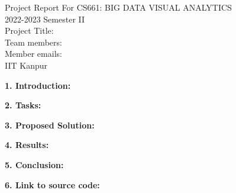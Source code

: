 \documentclass[a4paper, 12pt]{article}
\begin{document}
\begin{center}
Project Report For CS661: BIG DATA VISUAL ANALYTICS\\
2022-2023 Semester II\\
Project Title: \\
Team members: \\
Member emails: \\
IIT Kanpur
\end{center}

\noindent\textbf{1. Introduction:} 

\noindent\textbf{2. Tasks:}

\noindent\textbf{3. Proposed Solution:} 

\noindent\textbf{4. Results:}

\noindent\textbf{5. Conclusion:}


\noindent\textbf{6. Link to source code:}

\end{document}

